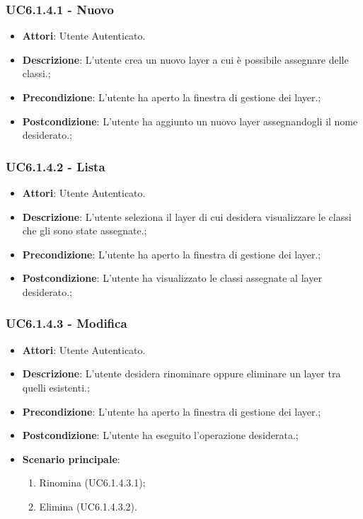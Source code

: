 \subsubsection{UC6.1.4.1 - Nuovo} 
\label{sssec:UC6.1.4.1} 
\begin{itemize} 
\item \textbf{Attori}: Utente Autenticato.
\item \textbf{Descrizione}: L'utente crea un nuovo layer a cui è possibile assegnare delle classi.;
\item \textbf{Precondizione}: L'utente ha aperto la finestra di gestione dei layer.;
\item \textbf{Postcondizione}: L'utente ha aggiunto un nuovo layer assegnandogli il nome desiderato.;
\end{itemize} 
\subsubsection{UC6.1.4.2 - Lista} 
\label{sssec:UC6.1.4.2} 
\begin{itemize} 
\item \textbf{Attori}: Utente Autenticato.
\item \textbf{Descrizione}: L'utente seleziona il layer di cui desidera visualizzare le classi che gli sono state assegnate.;
\item \textbf{Precondizione}: L'utente ha aperto la finestra di gestione dei layer.;
\item \textbf{Postcondizione}: L'utente ha visualizzato le classi assegnate al layer desiderato.;
\end{itemize} 
\subsubsection{UC6.1.4.3 - Modifica} 
\label{sssec:UC6.1.4.3} 
\begin{itemize} 
\item \textbf{Attori}: Utente Autenticato.
\item \textbf{Descrizione}: L'utente desidera rinominare oppure eliminare un layer tra quelli esistenti.;
\item \textbf{Precondizione}: L'utente ha aperto la finestra di gestione dei layer.;
\item \textbf{Postcondizione}: L'utente ha eseguito l'operazione desiderata.;
\item \textbf{Scenario principale}: \begin{enumerate}\item Rinomina (UC6.1.4.3.1);\item Elimina (UC6.1.4.3.2). 
 \end{enumerate}
\end{itemize} 
